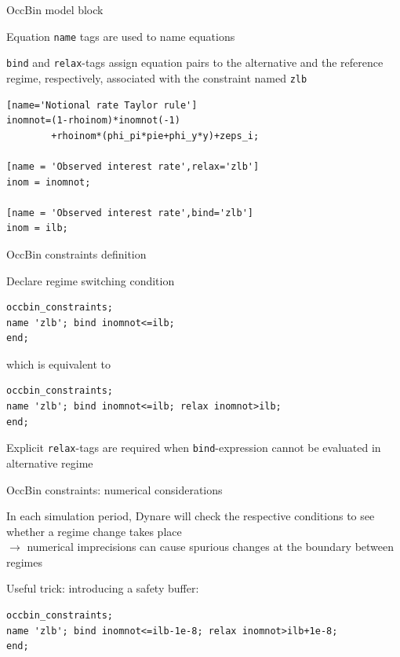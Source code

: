 \begin{frame}[fragile]{OccBin model block}
\begin{wideitemize}
\item Equation \texttt{name} tags are used to name equations
\item \texttt{bind} and \texttt{relax}-tags assign equation pairs to the alternative and the reference regime, respectively, associated with the constraint named \texttt{zlb}
\begin{verbatim}
[name='Notional rate Taylor rule']
inomnot=(1-rhoinom)*inomnot(-1)
        +rhoinom*(phi_pi*pie+phi_y*y)+zeps_i;

[name = 'Observed interest rate',relax='zlb']
inom = inomnot;

[name = 'Observed interest rate',bind='zlb']
inom = ilb;
\end{verbatim}
\end{wideitemize}
\end{frame}

\begin{frame}[fragile]{OccBin constraints definition}
\begin{wideitemize}
\item Declare regime switching condition
\begin{verbatim}
occbin_constraints;
name 'zlb'; bind inomnot<=ilb;
end;
\end{verbatim}
which is equivalent to
\begin{verbatim}
occbin_constraints;
name 'zlb'; bind inomnot<=ilb; relax inomnot>ilb;
end;
\end{verbatim}
\item Explicit \texttt{relax}-tags are required when \texttt{bind}-expression cannot be evaluated in alternative regime
\end{wideitemize}
\end{frame}



\begin{frame}[fragile]{OccBin constraints: numerical considerations}
\begin{wideitemize}
\item In each simulation period, Dynare will check the respective conditions to see whether a regime change takes place\\
    $\rightarrow$ numerical imprecisions can cause spurious changes at the boundary between regimes
\item Useful trick: introducing a safety buffer:
\begin{verbatim}
occbin_constraints;
name 'zlb'; bind inomnot<=ilb-1e-8; relax inomnot>ilb+1e-8;
end;
\end{verbatim}
\end{wideitemize}
\end{frame}

